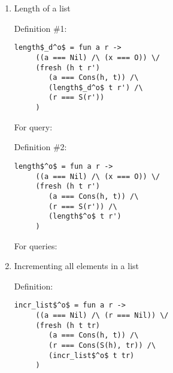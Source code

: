 \begin{enumerate}
\item Length of a list

\begin{minipage}{\linewidth}
Definition \#1:

\begin{lstlisting}[basicstyle=\small]
   length$_d^o$ = fun a r ->
     ((a === Nil) /\ (x === O)) \/
     (fresh (h t r')
        (a === Cons(h, t)) /\
        (length$_d^o$ t r') /\
        (r === S(r'))
     )
\end{lstlisting}
\end{minipage}

\begin{minipage}{\linewidth}
For query:

\end{minipage}

\begin{minipage}{\linewidth}
Definition \#2:

\begin{lstlisting}[basicstyle=\small]
   length$^o$ = fun a r ->
     ((a === Nil) /\ (x === O)) \/
     (fresh (h t r')
        (a === Cons(h, t)) /\
        (r === S(r')) /\
        (length$^o$ t r')
     )
\end{lstlisting}
\end{minipage}

\begin{minipage}{\linewidth}
For queries:

\end{minipage}


\item Incrementing all elements in a list

\begin{minipage}{\linewidth}
Definition:

\begin{lstlisting}[basicstyle=\small]
   incr_list$^o$ = fun a r ->
     ((a === Nil) /\ (r === Nil)) \/
     (fresh (h t tr)
        (a === Cons(h, t)) /\
        (r === Cons(S(h), tr)) /\
        (incr_list$^o$ t tr)
     )
\end{lstlisting}
\end{minipage}


\end{enumerate}
